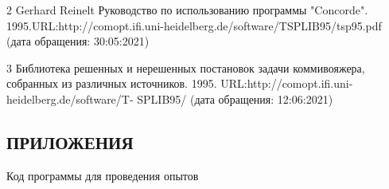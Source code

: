 \documentclass[a4paper, 14pt]{extarticle}
\numberwithin{equation}{section}
\begin{document}
2 Gerhard Reinelt Руководство по использованию программы "Concorde". 1995.URL:http://comopt.ifi.uni-heidelberg.de/software/TSPLIB95/tsp95.pdf (дата обращения: 30:05:2021)

3 Библиотека решенных и нерешенных постановок задачи коммивояжера, собранных из различных источников. 1995. URL:http://comopt.ifi.uni-heidelberg.de/software/T-
SPLIB95/ (дата обращения: 12:06:2021)

\newpage

\begin{center}
\chapter{\textbf{ПРИЛОЖЕНИЯ}}
\end{center}

Код программы для проведения опытов
\end{document}
